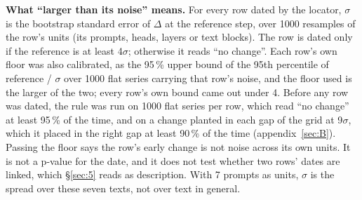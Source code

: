 \documentclass[11pt]{article}
\begin{document}
\textbf{What ``larger than its noise'' means.} For every row dated by the locator, $\sigma $ is the bootstrap standard error of $\Delta $ at the reference step, over 1000 resamples of the row's units (its prompts, heads, layers or text blocks). The row is dated only if the reference is at least 4$\sigma $; otherwise it reads ``no change''. Each row's own floor was also calibrated, as the 95\,\% upper bound of the 95th percentile of reference / $\sigma $ over 1000 flat series carrying that row's noise, and the floor used is the larger of the two; every row's own bound came out under 4. Before any row was dated, the rule was run on 1000 flat series per row, which read ``no change'' at least 95\,\% of the time, and on a change planted in each gap of the grid at 9$\sigma $, which it placed in the right gap at least 90\,\% of the time (appendix~\ref{sec:B}). Passing the floor says the row's early change is not noise across its own units. It is not a p-value for the date, and it does not test whether two rows' dates are linked, which \S\ref{sec:5} reads as description. With 7 prompts as units, $\sigma $ is the spread over these seven texts, not over text in general.
\end{document}
